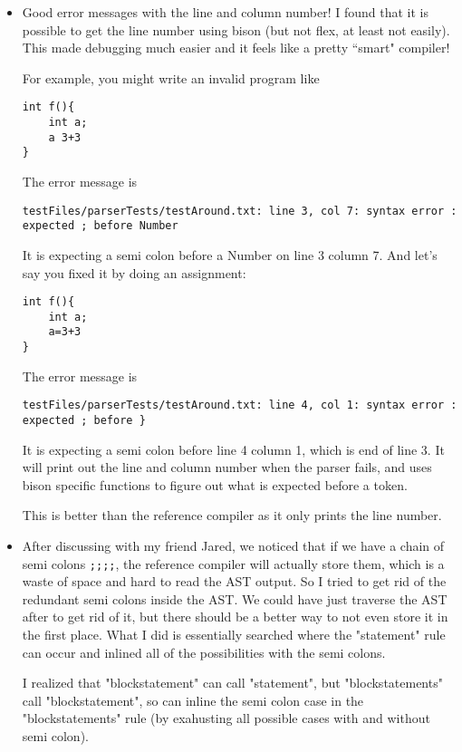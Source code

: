 \documentclass{article}
\begin{document}
\begin{itemize}
    \item Good error messages with the line and column number! I found that it is possible to get the line number using bison (but not flex, at least not easily). This made debugging much easier and it feels like a pretty ``smart" compiler!

        For example, you might write an invalid program like
        \begin{verbatim}
int f(){
    int a;
    a 3+3
}
        \end{verbatim}
        The error message is 
        \begin{verbatim}
testFiles/parserTests/testAround.txt: line 3, col 7: syntax error : expected ; before Number
        \end{verbatim}
        It is expecting a semi colon before a Number on line 3 column 7. And let's say you fixed it by doing an assignment:
        \begin{verbatim}
int f(){
    int a;
    a=3+3
}
        \end{verbatim}
        The error message is 
        \begin{verbatim}
testFiles/parserTests/testAround.txt: line 4, col 1: syntax error : expected ; before }
        \end{verbatim}
        It is expecting a semi colon before line 4 column 1, which is end of line 3.
        It will print out the line and column number when the parser fails, and uses bison specific functions to figure out what is expected before a token.

        This is better than the reference compiler as it only prints the line number.

    \item After discussing with my friend Jared, we noticed that if we have a chain of semi colons \verb|;;;;|, the reference compiler will actually store them, which is a waste of space and hard to read the AST output.
        So I tried to get rid of the redundant semi colons inside the AST. We could have just traverse the AST after to get rid of it, but there should be a better way to not even store it in the first place.
        What I did is essentially searched where the "statement" rule can occur and inlined all of the possibilities with the semi colons.

        I realized that  "blockstatement" can call "statement", but "blockstatements" call "blockstatement", so can inline the semi colon case in the "blockstatements" rule (by exahusting all possible cases with and without semi colon).


\end{itemize}
\end{document}
